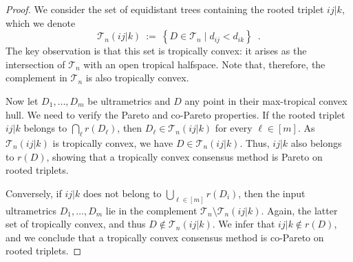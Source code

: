 \documentclass[10pt,a4paper]{amsart}
\newcommand\SetOf[2]{\left\{#1 \mid #2\right\}}
\newcommand\cT{{\mathcal T}}
\begin{document}
\begin{proof}
  We consider the set of equidistant trees containing the rooted triplet $ij|k$, which we denote
  \[
    \cT_n(ij|k) \ := \ \SetOf{D\in\cT_n}{d_{ij}<d_{ik}} \enspace.
  \]
  The key observation is that this set is tropically convex: it arises as the intersection of $\cT_n$ with an open tropical halfspace.
  Note that, therefore, the complement in $\cT_n$ is also tropically convex.

  Now let $D_1,\dots,D_m$ be ultrametrics and $D$ any point in their max-tropical convex hull.
  We need to verify the Pareto and co-Pareto properties.
  If the rooted triplet $ij|k$ belongs to $\bigcap_{\ell}r(D_\ell)$, then $D_\ell\in\cT_n(ij|k)$ for every $\ell\in[m]$.
  As $\cT_n(ij|k)$ is tropically convex, we have  $D\in\cT_n(ij|k)$.
  Thus, $ij|k$ also belongs to $r(D)$, showing that a tropically convex consensus method is Pareto on rooted triplets.

  Conversely, if $ij|k$ does not belong to $\bigcup_{\ell\in[m]}r(D_i)$, then the input ultrametrics $D_1,\dots,D_m$ lie in the complement $\cT_n\setminus\cT_n(ij|k)$.
  Again, the latter set of tropically convex, and thus $D\notin\cT_n(ij|k)$.
  We infer that $ij|k\notin r(D)$, and we conclude that a tropically convex consensus method is co-Pareto on rooted triplets.
\end{proof}
\end{document}
